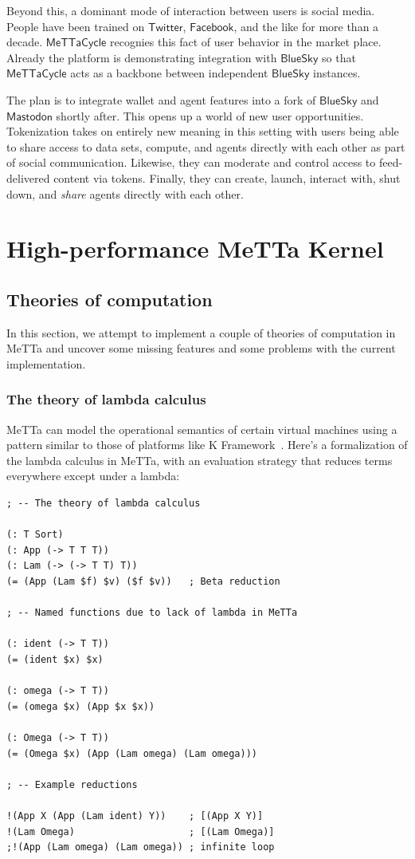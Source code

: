 \documentclass{article}
\newcommand{\MC}{\mathsf{MeTTaCycle}}
\begin{document}
Beyond this, a dominant mode of interaction between users is social
media. People have been trained on $\mathsf{Twitter}$,
$\mathsf{Facebook}$, and the like for more than a decade. $\MC$
recognies this fact of user behavior in the market place. Already the
platform is demonstrating integration with $\mathsf{BlueSky}$ so that
$\MC$ acts as a backbone between independent $\mathsf{BlueSky}$
instances.

The plan is to integrate wallet and agent features into a fork of
$\mathsf{BlueSky}$ and $\mathsf{Mastodon}$ shortly after. This opens
up a world of new user opportunities. Tokenization takes on entirely
new meaning in this setting with users being able to share access to
data sets, compute, and agents directly with each other as part of
social communication. Likewise, they can moderate and control access
to feed-delivered content via tokens. Finally, they can create,
launch, interact with, shut down, and \emph{share} agents directly
with each other.

\section{High-performance MeTTa Kernel}

\subsection{Theories of computation}
\label{Theories of computation}

In this section, we attempt to implement a couple of theories of computation in MeTTa and uncover some missing features and some problems with the current implementation.

\subsubsection{The theory of lambda calculus}
MeTTa can model the operational semantics of certain virtual machines using a pattern similar to those of platforms like K Framework~\cite{kframework}.  Here's a formalization of the lambda calculus in MeTTa, with an evaluation strategy that reduces terms everywhere except under a lambda:

\begin{verbatim}
; -- The theory of lambda calculus

(: T Sort)
(: App (-> T T T))
(: Lam (-> (-> T T) T))
(= (App (Lam $f) $v) ($f $v))   ; Beta reduction

; -- Named functions due to lack of lambda in MeTTa

(: ident (-> T T))
(= (ident $x) $x)

(: omega (-> T T))
(= (omega $x) (App $x $x))

(: Omega (-> T T))
(= (Omega $x) (App (Lam omega) (Lam omega)))

; -- Example reductions

!(App X (App (Lam ident) Y))    ; [(App X Y)]
!(Lam Omega)                    ; [(Lam Omega)]
;!(App (Lam omega) (Lam omega)) ; infinite loop
\end{verbatim}
\end{document}
